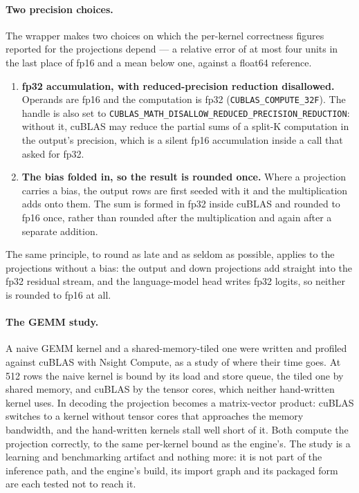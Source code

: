 \documentclass[11pt]{article}
\begin{document}
\paragraph{Two precision choices.} The wrapper makes two choices on which the
per-kernel correctness figures reported for the projections depend --- a
relative error of at most four units in the last place of fp16 and a mean below
one, against a float64 reference.
\begin{enumerate}
\item \textbf{fp32 accumulation, with reduced-precision reduction disallowed.}
Operands are fp16 and the computation is fp32 (\texttt{CUBLAS\_COMPUTE\_32F}).
The handle is also set to
\texttt{CUBLAS\_MATH\_DISALLOW\_REDUCED\_PRECISION\_REDUCTION}: without it,
cuBLAS may reduce the partial sums of a split-K computation in the output's
precision, which is a silent fp16 accumulation inside a call that asked for fp32.
\item \textbf{The bias folded in, so the result is rounded once.} Where a
projection carries a bias, the output rows are first seeded with it and the
multiplication adds onto them. The sum is formed in fp32 inside cuBLAS and
rounded to fp16 once, rather than rounded after the multiplication and again
after a separate addition.
\end{enumerate}
The same principle, to round as late and as seldom as possible, applies to the
projections without a bias: the output and down projections add straight into
the fp32 residual stream, and the language-model head writes fp32 logits, so
neither is rounded to fp16 at all.

\paragraph{The GEMM study.} A naive GEMM kernel and a shared-memory-tiled one were
written and profiled against cuBLAS with Nsight Compute, as a study of where
their time goes. At 512 rows the naive kernel is bound by its load and store
queue, the tiled one by shared memory, and cuBLAS by the tensor cores, which
neither hand-written kernel uses. In decoding the projection becomes a
matrix-vector product: cuBLAS switches to a kernel without tensor cores that
approaches the memory bandwidth, and the hand-written kernels stall well short of
it. Both compute the projection correctly, to the same per-kernel bound
as the engine's. The study is a learning and benchmarking artifact and nothing
more: it is not part of the inference path, and the engine's build, its import
graph and its packaged form are each tested not to reach it.
\end{document}
